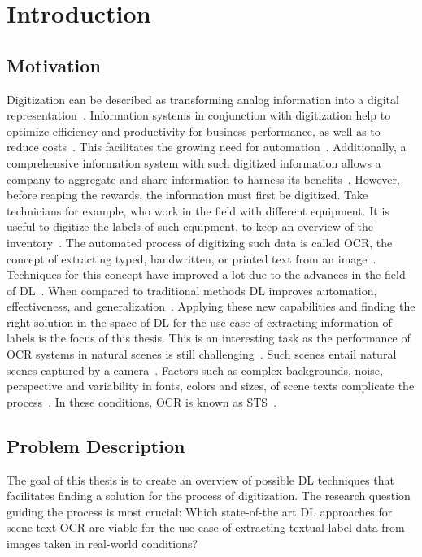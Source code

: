 \chapter{Introduction}\label{ch:intro}
\section{Motivation}
Digitization can be described as transforming analog information into a digital
representation~\citep{imgrund_approaching_2018}.
Information systems in conjunction with digitization help to optimize efficiency and productivity
for business performance, as well as to reduce costs~\citep{imgrund_approaching_2018}.
This facilitates the growing need for automation~\citep{imgrund_approaching_2018}.
Additionally, a comprehensive information system with such digitized information allows a company
to aggregate and share information to harness its benefits~\citep{goodhue_impact_1992}.
However, before reaping the rewards, the information must first be digitized.
Take technicians for example, who work in the field with different equipment.
It is useful to digitize the labels of such equipment, to keep an overview of the
inventory~\citep{abramowicz_business_2019}.
The automated process of digitizing such data is called \ac{OCR}, the concept of extracting typed,
handwritten, or printed text from an image~\citep{zhao_improving_2020}.
Techniques for this concept have improved a lot due to the advances in the field of
\ac{DL}~\citep{zhao_improving_2020}.
When compared to traditional methods \ac{DL} improves automation, effectiveness, and
generalization~\citep{chen_text_2021}.
Applying these new capabilities and finding the right solution in the space of \ac{DL} for the
use case of extracting information of labels is the focus of this thesis.
This is an interesting task as the performance of \ac{OCR} systems in natural scenes is still
challenging~\citep{zhao_improving_2020, chen_text_2021}.
Such scenes entail natural scenes captured by a camera~\citep{chen_text_2021, baek_what_2019}.
Factors such as complex backgrounds, noise, perspective and variability in fonts, colors and sizes,
of scene texts complicate the process~\citep{hu_gtc_2020,chen_text_2021,baek_what_2019}.
In these conditions, \ac{OCR} is known as \ac{STS}~\citep{long_scene_2021}.

\section{Problem Description}\label{se:problem}
The goal of this thesis is to create an overview of possible \ac{DL} techniques that facilitates
finding a solution for the process of digitization.
The research question guiding the process is most crucial:
Which state-of-the art \ac{DL} approaches for scene text \ac{OCR} are viable for the use case of
extracting textual label data from images taken in real-world conditions?

